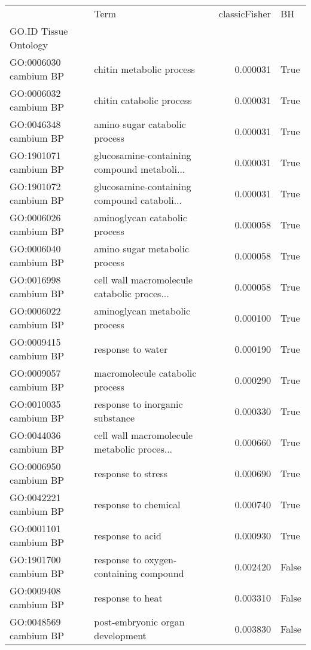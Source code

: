 \begin{tabular}{llrl}
\toprule
{} &                                         Term &  classicFisher &     BH \\
GO.ID      Tissue  Ontology &                                              &                &        \\
GO:0006030 cambium BP       &  chitin metabolic process &  0.000031 &  True \\
\midrule
GO:0006032 cambium BP       &  chitin catabolic process &  0.000031 &  True \\
GO:0046348 cambium BP       &  amino sugar catabolic process &  0.000031 &  True \\
GO:1901071 cambium BP       &  glucosamine-containing compound metaboli... &  0.000031 &  True \\
GO:1901072 cambium BP       &  glucosamine-containing compound cataboli... &  0.000031 &  True \\
GO:0006026 cambium BP       &  aminoglycan catabolic process &  0.000058 &  True \\
GO:0006040 cambium BP       &  amino sugar metabolic process &  0.000058 &  True \\
GO:0016998 cambium BP       &  cell wall macromolecule catabolic proces... &  0.000058 &  True \\
GO:0006022 cambium BP       &  aminoglycan metabolic process &  0.000100 &  True \\
GO:0009415 cambium BP       &  response to water &  0.000190 &  True \\
GO:0009057 cambium BP       &  macromolecule catabolic process &  0.000290 &  True \\
GO:0010035 cambium BP       &  response to inorganic substance &  0.000330 &  True \\
GO:0044036 cambium BP       &  cell wall macromolecule metabolic proces... &  0.000660 &  True \\
GO:0006950 cambium BP       &  response to stress &  0.000690 &  True \\
GO:0042221 cambium BP       &  response to chemical &  0.000740 &  True \\
GO:0001101 cambium BP       &  response to acid &  0.000930 &  True \\
GO:1901700 cambium BP       &  response to oxygen-containing compound &  0.002420 &  False \\
GO:0009408 cambium BP       &  response to heat &  0.003310 &  False \\
GO:0048569 cambium BP       &  post-embryonic organ development &  0.003830 &  False \\

\end{tabular}
